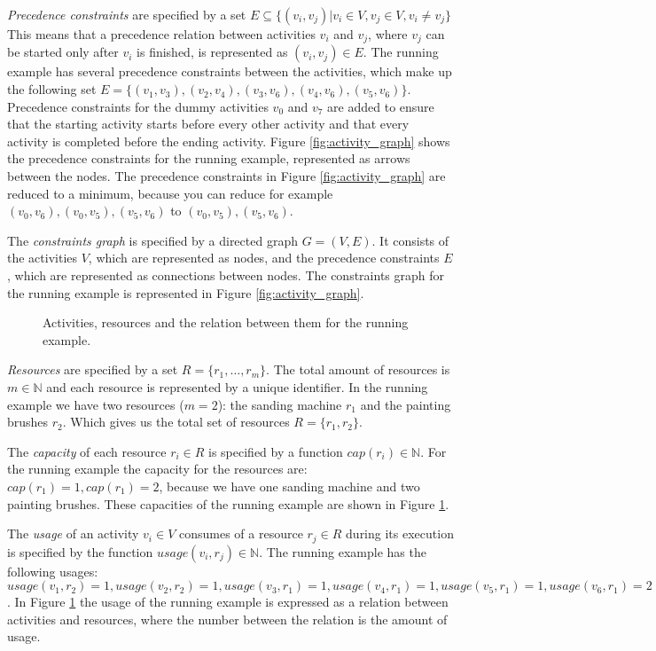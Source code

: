 \documentclass{article}
\theoremstyle{definition}
\newcommand{\inputtikz}[1]{}
\newcommand{\res}[0]{\ensuremath{R}} %
\newcommand{\capa}[1]{\ensuremath{cap(r_{#1})}} %
\newcommand{\usage}[2]{\ensuremath{usage(v_{#1}, r_{#2})}} %
\begin{document}
\emph{Precedence constraints} are specified by a set $E \subseteq \{(v_i, v_j) | v_i \in V, v_j \in V, v_i \neq v_j\}$
This means that a precedence relation between activities $v_i$ and $v_j$, where $v_j$ can be started only after $v_i$ is finished, is represented as $(v_i, v_j) \in E$.
The running example has several precedence constraints between the activities, which make up the following set $E = \{(v_1, v_3), (v_2, v_4), (v_3, v_6), (v_4, v_6), (v_5, v_6)\}$.
Precedence constraints for the dummy activities $v_0$ and $v_7$ are added to ensure that the starting activity starts before every other activity and that every activity is completed before the ending activity.
Figure \ref{fig:activity_graph} shows the precedence constraints for the running example, represented as arrows between the nodes.
The precedence constraints in Figure \ref{fig:activity_graph} are reduced to a minimum, because you can reduce for example $(v_0,v_6), (v_0, v_5), (v_5, v_6)$ to $(v_0, v_5), (v_5, v_6)$.

The \emph{constraints graph} is specified by a directed graph $G = (V, E)$.
It consists of the activities $V$, which are represented as nodes, and the precedence constraints $E$, which are represented as connections between nodes.
The constraints graph for the running example is represented in Figure \ref{fig:activity_graph}.

\begin{figure}[h]
	\centering
	\inputtikz{usage}
	\caption{Activities, resources and the relation between them for the running example.}
	\label{fig:resource_graph}
\end{figure}

\emph{Resources} are specified by a set $R = \{r_1, \ldots, r_m\}$.
The total amount of resources is $m \in \mathbb{N}$ and each resource is represented by a unique identifier. %
In the running example we have two resources ($m = 2$): the sanding machine $r_1$ and the painting brushes $r_2$.
Which gives us the total set of resources $R = \{r_1, r_2\}$.

The \emph{capacity} of each resource $r_i \in R$ is specified by a function $\capa{i} \in \mathbb{N}$.
For the running example the capacity for the resources are: $\capa{1} = 1, \capa{1} = 2$, because we have one sanding machine and two painting brushes.
These capacities of the running example are shown in Figure \ref{fig:resource_graph}.

The \emph{usage} of an activity $v_i \in V$ consumes of a resource $r_j \in \res$ during its execution is specified by the function $\usage{i}{j} \in \mathbb{N}$.
The running example has the following usages: $\usage{1}{2} = 1, \usage{2}{2} = 1, \usage{3}{1} = 1, \usage{4}{1} = 1, \usage{5}{1} = 1, \usage{6}{1} = 2$.
In Figure \ref{fig:resource_graph} the usage of the running example is expressed as a relation between activities and resources, where the number between the relation is the amount of usage.
\end{document}
